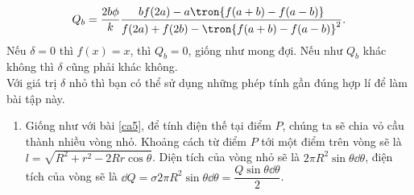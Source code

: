\begin{vd}
\begin{enumerate}[1)]
        \begin{equation}
            \begin{aligned}
                Q_b=\dfrac{2b\phi}{k}\dfrac{bf(2a)-a\tron{f(a+b)-f(a-b)}}{f(2a)+f(2b)-\tron{f(a+b)-f(a-b)}^2}.
            \end{aligned}
        \end{equation}
        Nếu $\delta=0$ thì $f(x)=x$, thì $Q_b=0$, giống như mong đợi. Nếu như $Q_b$ khác không thì $\delta$ cũng phải khác không.\\
        Với giá trị $\delta$ nhỏ thì bạn có thể sử dụng những phép tính gần đúng hợp lí để làm bài tập này.
    \end{enumerate}
    \end{vd}
     \begin{loigiai}
    \begin{enumerate}[1)]
    \setlength{\itemsep}{0pt}
        \item Giống như với bài \ref{ca5}, để tính điện thế tại điểm $P$, chúng ta sẽ chia vỏ cầu thành nhiều vòng nhỏ. Khoảng cách từ điểm $P$ tới một điểm trên vòng sẽ là $l=\sqrt{R^2+r^2-2Rr\cos\theta}$. Diện tích của vòng nhỏ sẽ là $2\pi R^2 \sin\theta\dd\theta$, điện tích của vòng sẽ là $\dd Q=\sigma2\pi R^2 \sin\theta\dd\theta=\dfrac{Q\sin\theta\dd\theta}{2}$. 
        \newpage
        \begin{center}
            


\begin{tikzpicture}[x=0.75pt,y=0.75pt,yscale=-1,xscale=1]


\end{tikzpicture}
\end{center}
\end{enumerate}
\end{loigiai}
